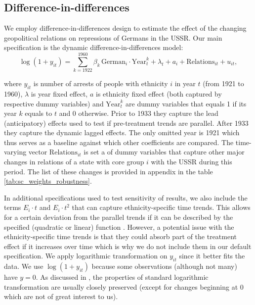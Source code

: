 \subsection{Difference-in-differences} \label{subsec:methodology_did}
We employ difference-in-differences design to estimate the effect of the changing geopolitical relations on repressions of Germans in the USSR. 
Our main specification is the dynamic difference-in-differences model:
\begin{equation}
 \log\left(1 + y_{it}\right) = \sum_{k= 1922}^{1960} \beta_k \, \text{German}_{i} \cdot \text{Year}_{t}^k +  \lambda_t + a_i +  \text{Relations}_{it}   + u_{it},
 \label{eq:dynamic_did}
\end{equation}

where $y_{it}$ is number of arrests of people with ethnicity $i$ in year $t$ (from 1921 to 1960), $\lambda$ is year fixed effect, $a$ is ethnicity fixed effect (both captured by respective dummy variables) and  $\text{Year}_{t}^k$ are dummy variables that equals 1 if its year $k$ equals to $t$ and 0 otherwise.
Prior to  1933 they capture the lead (anticipatory) effects  used to test if pre-treatment trends are parallel. After 1933 they capture the dynamic lagged effects. The only omitted year is 1921 which thus serves as a baseline against which other coefficients are compared. 
The time-varying vector $\text{Relations}_{it}$ is set a of dummy variables that capture other major changes in relations of a state with core group $i$ with the USSR during this period. The list of these changes is provided in appendix in the table \ref{tab:sc_weights_robustness}.

In additional specifications used to test sensitivity of results, we also include  the terms $ E_i \cdot t$ and $ E_i \cdot t^2$  that can capture  ethnicity-specific time trends. 
This allows for a certain  deviation from the parallel trends if it can be described by the specified (quadratic or linear) function \citep[chapter 5]{angrist_mostly_2009}. 
However, a potential issue with the ethnicity-specific time trends is that they could absorb part of the treatment effect if it increases over time \citep{meer_effects_2016} which is why we do not include them in our default specification. 
 We apply logarithmic transformation on $y_{it}$ since it better fits the data.  We use $\log\left(1 + y_{it}\right)$ because some observations (although not many) have $y = 0$. As discussed in \citet[p. 193]{wooldridge_introductory_2015},  the 
 properties of standard logarithmic transformation
 are usually  closely preserved (except for changes beginning at 0 which are not of great interest to us).   

